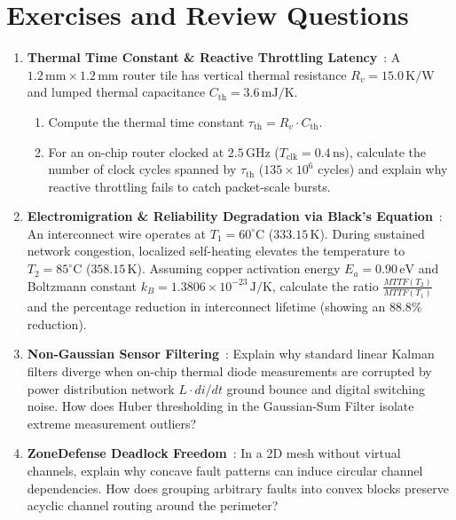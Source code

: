 \section{Exercises and Review Questions}
\label{sec:ch7_exercises}

\begin{enumerate}
    \item \textbf{Thermal Time Constant \& Reactive Throttling Latency}~\cite{Skadron2003,Huang2006}: A $1.2\,\mathrm{mm} \times 1.2\,\mathrm{mm}$ router tile has vertical thermal resistance $R_v = 15.0\,\mathrm{K/W}$ and lumped thermal capacitance $C_{\mathrm{th}} = 3.6\,\mathrm{mJ/K}$.
    \begin{enumerate}
        \item Compute the thermal time constant $\tau_{\mathrm{th}} = R_v \cdot C_{\mathrm{th}}$.
        \item For an on-chip router clocked at $2.5\,\mathrm{GHz}$ ($T_{\mathrm{clk}} = 0.4\,\mathrm{ns}$), calculate the number of clock cycles spanned by $\tau_{\mathrm{th}}$ ($135 \times 10^6$ cycles) and explain why reactive throttling fails to catch packet-scale bursts.
    \end{enumerate}

    \item \textbf{Electromigration \& Reliability Degradation via Black's Equation}~\cite{Black1969}: An interconnect wire operates at $T_1 = 60^\circ\mathrm{C}$ ($333.15\,\mathrm{K}$). During sustained network congestion, localized self-heating elevates the temperature to $T_2 = 85^\circ\mathrm{C}$ ($358.15\,\mathrm{K}$). Assuming copper activation energy $E_a = 0.90\,\mathrm{eV}$ and Boltzmann constant $k_B = 1.3806 \times 10^{-23}\,\mathrm{J/K}$, calculate the ratio $\frac{MTTF(T_2)}{MTTF(T_1)}$ and the percentage reduction in interconnect lifetime (showing an $88.8\%$ reduction).

    \item \textbf{Non-Gaussian Sensor Filtering}~\cite{Fu2019,Fu2017}: Explain why standard linear Kalman filters diverge when on-chip thermal diode measurements are corrupted by power distribution network $L \cdot di/dt$ ground bounce and digital switching noise. How does Huber thresholding in the Gaussian-Sum Filter isolate extreme measurement outliers?

    \item \textbf{ZoneDefense Deadlock Freedom}~\cite{Fu2014,Glass1994}: In a 2D mesh without virtual channels, explain why concave fault patterns can induce circular channel dependencies. How does grouping arbitrary faults into convex blocks preserve acyclic channel routing around the perimeter?
\end{enumerate}

